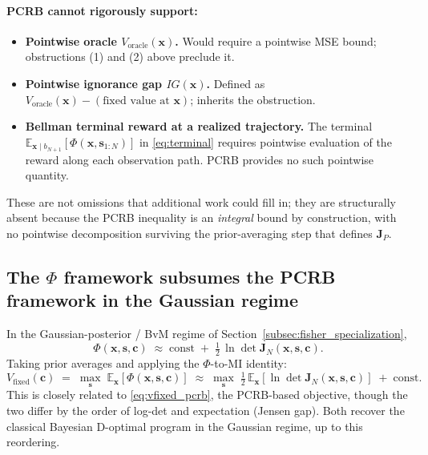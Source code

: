 \documentclass[11pt,a4paper]{article}
\newcommand{\E}{\mathbb{E}}
\begin{document}
\paragraph{PCRB cannot rigorously support:}
\begin{itemize}[nosep, leftmargin=2em]
  \item \textbf{Pointwise oracle $V_{\mathrm{oracle}}(\bm{x})$.}  Would require a pointwise MSE bound; obstructions (1) and (2) above preclude it.
  \item \textbf{Pointwise ignorance gap $IG(\bm{x})$.}  Defined as $V_{\mathrm{oracle}}(\bm{x}) - (\text{fixed value at } \bm{x})$; inherits the obstruction.
  \item \textbf{Bellman terminal reward at a realized trajectory.}  The terminal $\E_{\bm{x}\mid b_{N+1}}[\Phi(\bm{x}, \bm{s}_{1:N})]$ in \eqref{eq:terminal} requires pointwise evaluation of the reward along each observation path.  PCRB provides no such pointwise quantity.
\end{itemize}

These are not omissions that additional work could fill in; they are structurally absent because the PCRB inequality is an \emph{integral} bound by construction, with no pointwise decomposition surviving the prior-averaging step that defines $\bm{J}_P$.

\subsection{The \texorpdfstring{$\Phi$}{Phi} framework subsumes the PCRB framework in the Gaussian regime}
\label{subsec:phi_subsumes}

In the Gaussian-posterior / BvM regime of Section~\ref{subsec:fisher_specialization},
\begin{equation}
  \Phi(\bm{x}, \bm{s}, \bm{c}) \;\approx\; \mathrm{const} \;+\; \tfrac{1}{2}\,\ln\det \bm{J}_N(\bm{x}, \bm{s}, \bm{c}).
\end{equation}
Taking prior averages and applying the $\Phi$-to-MI identity:
\begin{equation}
  V_{\mathrm{fixed}}(\bm{c}) \;=\; \max_{\bm{s}}\; \E_{\bm{x}}[\Phi(\bm{x}, \bm{s}, \bm{c})] \;\approx\; \max_{\bm{s}}\; \tfrac{1}{2}\,\E_{\bm{x}}[\ln\det \bm{J}_N(\bm{x}, \bm{s}, \bm{c})] \;+\; \mathrm{const}.
  \label{eq:vfixed_gaussian}
\end{equation}
This is closely related to \eqref{eq:vfixed_pcrb}, the PCRB-based objective, though the two differ by the order of log-det and expectation (Jensen gap).  Both recover the classical Bayesian D-optimal program in the Gaussian regime, up to this reordering.
\end{document}
